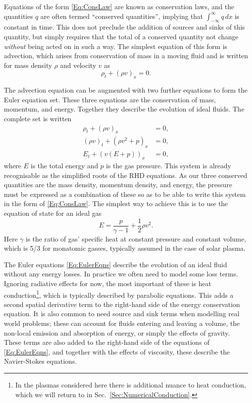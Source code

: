 Equations of the form \eqref{Eq:ConsLaw} are known as conservation laws, and the quantities $q$ are often termed ``conserved quantities'', implying that $\int_{-\infty}^{\infty} q\, dx$ is constant in time.
This does not preclude the addition of sources and sinks of this quantity, but simply requires that the total of a conserved quantity not change \emph{without} being acted on in such a way.
The simplest equation of this form is advection, which arises from conservation of mass in a moving fluid and is written for mass density $\rho$ and velocity $v$ as
\begin{equation}\label{Eq:Advection}
    \rho_t + (\rho v)_x = 0.
\end{equation}

The advection equation can be augmented with two further equations to form the Euler equation set.
These three equations are the conservation of mass, momentum, and energy.
Together they describe the evolution of ideal fluids.
The complete set is written
\begin{equation}\label{Eq:EulerEqns}
\begin{split}
    \rho_t + (\rho v)_x &= 0,\\
    (\rho v)_t + (\rho v^2 + p)_x &= 0,\\
    E_t + (v(E + p))_x &= 0,
\end{split}
\end{equation}
where $E$ is the total energy and $p$ is the gas pressure.
This system is already recognisable as the simplified roots of the RHD equations.
As our three conserved quantities are the mass density, momentum density, and energy, the pressure must be expressed as a combination of these so as to be able to write this system in the form of \eqref{Eq:ConsLaw}.
The simplest way to achieve this is to use the equation of state for an ideal gas
\begin{equation}
    E = \frac{p}{\gamma-1} + \frac{1}{2}\rho v^2.
\end{equation}
Here $\gamma$ is the ratio of gas' specific heat at constant pressure and constant volume, which is 5/3 for monatomic gasses, typically assumed in the case of solar plasma.

The Euler equations \eqref{Eq:EulerEqns} describe the evolution of an ideal fluid without any energy losses.
In practice we often need to model some loss terms.
Ignoring radiative effects for now, the most important of these is heat conduction\footnote{In the plasmas considered here there is additional nuance to heat conduction, which we will return to in Sec.~\ref{Sec:NumericalConduction}.}, which is typically described by parabolic equations.
This adds a second spatial derivative term to the right-hand side of the energy conservation equation.
It is also common to need source and sink terms when modelling real world problems; these can account for fluids entering and leaving a volume, the non-local emission and absorption of energy, or simply the effects of gravity.
These terms are also added to the right-hand side of the equations of \eqref{Eq:EulerEqns}, and together with the effects of viscosity, these describe the Navier-Stokes equations.

